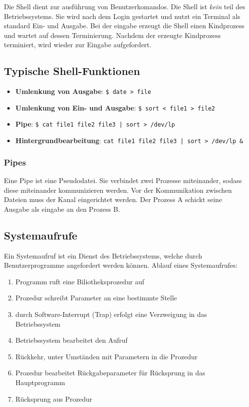 Die Shell dient zur ausführung von Benutzerkomandos. Die Shell ist
\textit{kein} teil des Betriebssystems. Sie wird nach dem Login gestartet und
nutzt ein Terminal als standard Ein- und Ausgabe. Bei der eingabe erzeugt die
Shell einen Kindprozess und wartet auf dessen Terminierung. Nachdem der
erzeugte Kindprozess terminiert, wird wieder zur Eingabe aufgefordert.

\subsection*{Typische Shell-Funktionen}

\begin{itemize}
    \item \textbf{Umlenkung von Ausgabe}: \texttt{\$ date > file}
    \item \textbf{Umlenkung von Ein- und Ausgabe}: \newline\texttt{\$ sort < file1 > file2}
    \item \textbf{Pipe}: \texttt{\$ cat file1 file2 file3 | sort > /dev/lp}
    \item \textbf{Hintergrundbearbeitung}: \newline\texttt{cat file1 file2 file3 | sort > /dev/lp \&}
\end{itemize}

\subsubsection{Pipes}

Eine Pipe ist eine Pseudodatei. Sie verbindet zwei Prozesse miteinander, sodass
diese miteinander kommunizieren werden. Vor der Kommunikation zwischen Dateien
muss der Kanal eingerichtet werden. Der Prozess A schickt seine Ausgabe als
eingabe an den Prozess B.

\subsection{Systemaufrufe}

Ein Systemaufruf ist ein Dienst des Betriebssystems, welche durch
Benutzerprogramme angefordert werden können. Ablauf eines Systemaufrufes:

\begin{enumerate}
    \item Programm ruft eine Biliotheksprozedur auf
    \item Prozedur schreibt Parameter an eine bestimmte Stelle
    \item durch Software-Interrupt (Trap) erfolgt eine Verzweigung in das Betriebssystem
    \item Betriebssystem bearbeitet den Aufruf
    \item Rückkehr, unter Umständen mit Parametern in die Prozedur
    \item Prozedur bearbeitet Rückgabeparameter für Rücksprung in das Hauptprogramm
    \item Rücksprung aus Prozedur
\end{enumerate}

